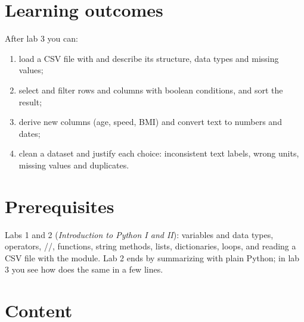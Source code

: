 \documentclass[11pt,a4paper]{article}
\begin{document}



\section{Learning outcomes}

After lab 3 you can:

\begin{enumerate}[label=\textbf{LO\arabic*}, leftmargin=1.4cm]
  \item load a CSV file with  and describe its structure,
        data types and missing values;
  \item select and filter rows and columns with boolean conditions, and
        sort the result;
  \item derive new columns (age, speed, BMI) and convert text to numbers
        and dates;
  \item clean a dataset and justify each choice: inconsistent text
        labels, wrong units, missing values and duplicates.
\end{enumerate}

\section{Prerequisites}

Labs 1 and 2 (\emph{Introduction to Python I and II}): variables and data
types, operators, //, functions, string
methods, lists, dictionaries, loops, and reading a CSV file with the
 module. Lab 2 ends by summarizing  with
plain Python; in lab 3 you see how  does the same in a few
lines.





\section{Content}
\end{document}
